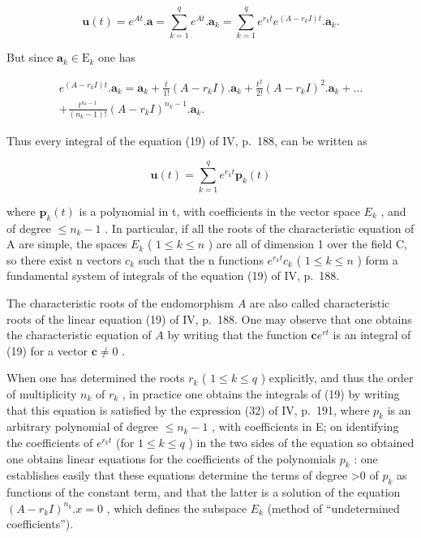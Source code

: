 \[
\mathbf {u} (t) = e ^ {A t}. \mathbf {a} = \sum_ {k = 1} ^ {q} e ^ {A t}. \mathbf {a} _ {k} = \sum_ {k = 1} ^ {q} e ^ {r _ {k} t} e ^ {(A - r _ {k} I) t}. \mathbf {a} _ {k}.
\]

But since \(\mathbf{a}_k\in \mathrm{E}_k\) one has

\[
\begin{array}{c} e ^ {(A - r _ {k} I) t}. \mathbf {a} _ {k} = \mathbf {a} _ {k} + \frac {t}{1 !} (A - r _ {k} I). \mathbf {a} _ {k} + \frac {t ^ {2}}{2 !} (A - r _ {k} I) ^ {2}. \mathbf {a} _ {k} + \dots \\ + \frac {t ^ {n _ {k} - 1}}{(n _ {k} - 1) !} (A - r _ {k} I) ^ {n _ {k} - 1}. \mathbf {a} _ {k}. \end{array}\tag{31}
\]

Thus every integral of the equation (19) of IV, p.~188, can be written as

\[
\mathbf {u} (t) = \sum_ {k = 1} ^ {q} e ^ {r _ {k} t} \mathbf {p} _ {k} (t)\tag{32}
\]

where \(\mathbf{p}_{k}(t)\) is a polynomial in t, with coefficients in the vector space \(E_{k}\) , and of degree \(\leqslant n_{k}-1\) . In particular, if all the roots of the characteristic equation of A are simple, the spaces \(E_{k}\) ( \(1 \leqslant k \leqslant n\) ) are all of dimension 1 over the field C, so there exist n vectors \(c_{k}\) such that the n functions \(e^{r_{k}t}c_{k}\) ( \(1 \leqslant k \leqslant n\) ) form a fundamental system of integrals of the equation (19) of IV, p.~188.

The characteristic roots of the endomorphism \(A\) are also called characteristic roots of the linear equation (19) of IV, p.~188. One may observe that one obtains the characteristic equation of \(A\) by writing that the function \(\mathbf{c}e^{rt}\) is an integral of (19) for a vector \(\mathbf{c} \neq 0\) .

When one has determined the roots \(r_{k}\) ( \(1 \leqslant k \leqslant q\) ) explicitly, and thus the order of multiplicity \(n_{k}\) of \(r_{k}\) , in practice one obtains the integrals of (19) by writing that this equation is satisfied by the expression (32) of IV, p.~191, where \(p_{k}\) is an arbitrary polynomial of degree \(\leqslant n_{k}-1\) , with coefficients in E; on identifying the coefficients of \(e^{r_{k}t}\) (for \(1 \leqslant k \leqslant q\) ) in the two sides of the equation so obtained one obtains linear equations for the coefficients of the polynomials \(p_{k}\) : one establishes easily that these equations determine the terms of degree \textgreater0 of \(p_{k}\) as functions of the constant term, and that the latter is a solution of the equation \((A - r_{k}I)^{n_{k}}.x = 0\) , which defines the subspace \(E_{k}\) (method of ``undetermined coefficients'').

